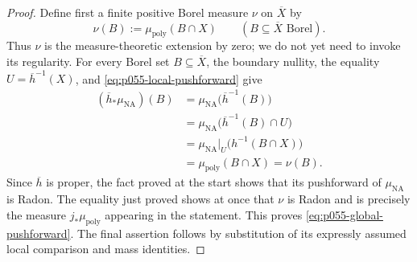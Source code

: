 \begin{proof}
Define first a finite positive Borel measure \(\nu\) on \(\overline X\) by
\[
 \nu(B):=\mu_{\mathrm{poly}}(B\cap X)
 \qquad(B\subseteq\overline X\text{ Borel}).
\]
Thus \(\nu\) is the measure-theoretic extension by zero; we do not yet need
to invoke its regularity.  For every Borel set \(B\subseteq\overline X\),
the boundary nullity, the equality \(U=\overline h^{-1}(X)\), and
\eqref{eq:p055-local-pushforward} give
\begin{align*}
 (\overline h_*\mu_{\mathrm{NA}})(B)
 &=\mu_{\mathrm{NA}}\bigl(\overline h^{-1}(B)\bigr)\\
 &=\mu_{\mathrm{NA}}\bigl(\overline h^{-1}(B)\cap U\bigr)\\
 &=\mu_{\mathrm{NA}}|_U\bigl(h^{-1}(B\cap X)\bigr)\\
 &=\mu_{\mathrm{poly}}(B\cap X)=\nu(B).
\end{align*}
Since \(\overline h\) is proper, the fact proved at the start shows that its
pushforward of \(\mu_{\mathrm{NA}}\) is Radon.  The equality just proved shows at
once that \(\nu\) is Radon and is precisely the measure
\(j_*\mu_{\mathrm{poly}}\) appearing in the statement.  This proves
\eqref{eq:p055-global-pushforward}.  The final assertion follows by
substitution of its expressly assumed local comparison and mass identities.
\end{proof}
